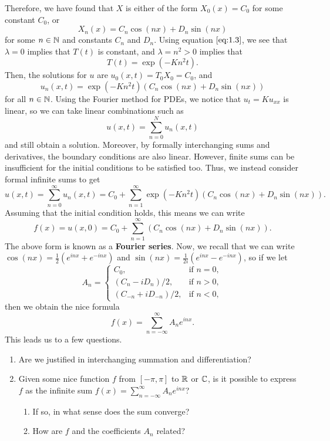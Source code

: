 Therefore, we have found that $X$ is either of the form $X_0(x) = C_0$
for some constant $C_0$, or 
\[ X_n(x) = C_n\cos(nx) + D_n\sin(nx) \] 
for some $n \in \mathbb{N}$ and constants $C_n$ and $D_n$. Using equation 
$\eqref{eq:1.3}$, we see that $\lambda = 0$ implies that $T(t)$ is constant, 
and $\lambda = n^2 > 0$ implies that 
\[ T(t) = \exp(-Kn^2t). \] 
Then, the solutions for $u$ are $u_0(x, t) = T_0 X_0 = C_0$, and 
\[ u_n(x, t) = \exp(-Kn^2t) (C_n\cos(nx) + D_n\sin(nx)) \]
for all $n \in \mathbb{N}$. Using the Fourier method for PDEs, we notice that 
$u_t = Ku_{xx}$ is linear, so we can take linear combinations such as 
\[ u(x, t) = \sum_{n=0}^N u_n(x, t) \] 
and still obtain a solution. Moreover, by formally interchanging 
sums and derivatives, the boundary conditions are also linear.
However, finite sums can be insufficient for the initial conditions to be 
satisfied too. Thus, we instead consider formal infinite sums to get 
\[ u(x, t) = \sum_{n=0}^\infty u_n(x, t) = C_0 + \sum_{n=1}^\infty 
\exp(-Kn^2t) (C_n\cos(nx) + D_n\sin(nx)). \] 
Assuming that the initial condition holds, this means we can write 
\[ f(x) = u(x, 0) = C_0 + \sum_{n=1}^\infty (C_n\cos(nx) + D_n\sin(nx)). \] 
The above form is known as a {\bf Fourier series}. Now, we recall that 
we can write $\cos(nx) = \frac12(e^{inx} + e^{-inx})$ and $\sin(nx) = 
\frac{1}{2i}(e^{inx} - e^{-inx})$, so if we let 
\[ A_n = \begin{cases} 
    C_0, & \text{if } n = 0, \\ 
    (C_n - iD_n)/2, & \text{if } n > 0, \\ 
    (C_{-n} + iD_{-n})/2, & \text{if } n < 0, 
\end{cases} \] 
then we obtain the nice formula 
\[ f(x) = \sum_{n=-\infty}^{\infty} A_n e^{inx}. \] 
This leads us to a few questions.
\begin{enumerate}
    \item Are we justified in interchanging summation and differentiation?
    \item Given some nice function $f$ from $[-\pi, \pi]$ to 
    $\mathbb{R}$ or $\mathbb{C}$, is it possible to express $f$ as the infinite sum 
    $f(x) = \sum_{n=-\infty}^\infty A_n e^{inx}$?
    \begin{enumerate}
        \item If so, in what sense does the sum converge?
        \item How are $f$ and the coefficients $A_n$ related?
    \end{enumerate}
\end{enumerate}

